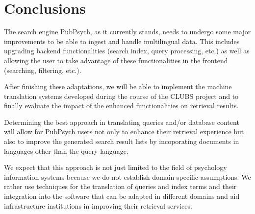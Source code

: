 \documentclass[a4paper,11pt]{article}
\begin{document}
\section{Conclusions}
\label{s:conclusions}

The search engine PubPsych, as it currently stands, needs to undergo some major improvements to be able to ingest and handle multilingual data. This includes upgrading backend functionalities (search index, query processing, etc.) as well as allowing the user to take advantage of these functionalities in the frontend (searching, filtering, etc.).

After finishing these adaptations, we will be able to implement the machine translation systems developed during the course of the CLUBS project and to finally evaluate the impact of the enhanced functionalities on retrieval results.

Determining the best approach in translating queries and/or database content will allow for PubPsych users not only to enhance their retrieval experience but also to improve the generated search result lists by incoporating documents in languages other than the query language.

We expect that this approach is not just limited to the field of psychology information systems because we do not establish domain-specific assumptions. We rather use techniques for the translation of queries and index terms and their integration into the software that can be adapted in different domains and aid infrastructure institutions in improving their retrieval services.



%


%
%
{}


\end{document}
